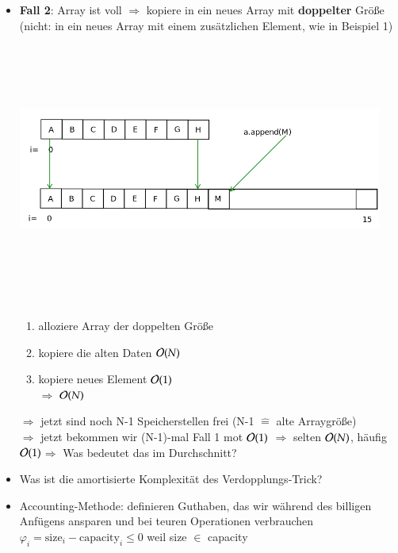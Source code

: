 \begin{itemize}
    \item \textbf{Fall 2}: Array ist voll $\Rightarrow$ kopiere in ein neues Array mit \textbf{doppelter} Größe \\
    (nicht: in ein neues Array mit einem zusätzlichen Element, wie in Beispiel 1) \\
    \includegraphics[width=12cm,height=9cm,keepaspectratio]{./Pictures/dynArrDopp.png}
    \begin{enumerate}
        \item alloziere Array der doppelten Größe
        \item kopiere die alten Daten \hspace*{3cm} \textcolor{blue}{$\mathcal{O}{}(N)$}
        \item kopiere neues Element  \hspace*{3.1cm} \textcolor{blue}{$\mathcal{O}{}(1)$} \\
        $\Rightarrow$ \textcolor{blue}{$\mathcal{O}{}(N)$}
    \end{enumerate}
    $\Rightarrow$ jetzt sind noch N-1 Speicherstellen frei (N-1 $\widehat{=}$ alte Arraygröße) \\
    $\Rightarrow$ jetzt bekommen wir (N-1)-mal Fall 1 mot $\mathcal{O}{}(1)$
    $\Rightarrow$ selten $\mathcal{O}{}(N)$, häufig $\mathcal{O}{}(1)$$\Rightarrow$ Was bedeutet das im Durchschnitt?

    \item Was ist die amortisierte Komplexität des \glqq Verdopplungs-Trick\grqq ?
    \item Accounting-Methode: definieren \glqq Guthaben\grqq, das wir während des billigen Anfügens ansparen und bei teuren Operationen verbrauchen \\
    $\varphi_i = \text{size}_i - \text{capacity}_i \leq 0$ weil size $\in$ capacity
\end{itemize}

